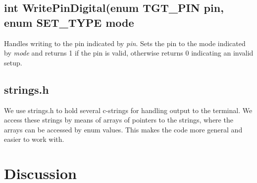 \documentclass[letterpaper,11pt]{texMemo} %
\begin{document}
\subsection*{int WritePinDigital(enum TGT\_PIN pin, enum SET\_TYPE mode}
Handles writing to the pin indicated by \textit{pin}. Sets the pin to the mode indicated by \textit{mode} and returns 1 if the pin is valid, otherwise returns 0 indicating an invalid setup.
\subsection*{strings.h}
We use strings.h to hold several c-strings for handling output to the terminal. We access these strings by means of arrays of pointers to the strings, where the arrays can be accessed by enum values. This makes the code more general and easier to work with.

\section*{Discussion}


\newpage
\end{document}

